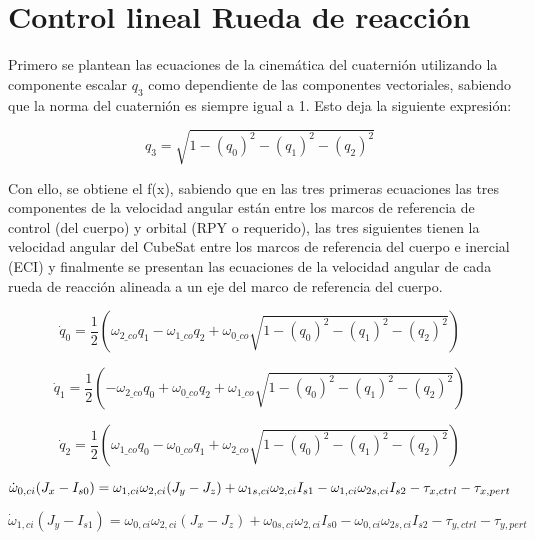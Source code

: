 \section{Control lineal Rueda de reacción}

\label{ap:Z6}

Primero se plantean las ecuaciones de la cinemática del cuaternión utilizando la componente escalar \( q_3 \) como dependiente de las componentes vectoriales, sabiendo que la norma del cuaternión es siempre igual a 1. Esto deja la siguiente expresión:

\[
q_3 = \sqrt{1 - (q_0)^2 - (q_1)^2 - (q_2)^2}
\]

Con ello, se obtiene el f(x), sabiendo que en las tres primeras ecuaciones las tres componentes de la velocidad angular están entre los marcos de referencia de control (del cuerpo) y orbital (RPY o requerido), las tres siguientes tienen la velocidad angular del CubeSat entre los marcos de referencia del cuerpo e inercial (ECI) y finalmente se presentan las ecuaciones de la velocidad angular de cada rueda de reacción alineada a un eje del marco de referencia del cuerpo.

\begin{equation}
	\dot{q}_0 = \frac{1}{2} \left( \omega_{2\_co} q_1 - \omega_{1\_co} q_2 + \omega_{0\_co} \sqrt{1 - (q_0)^2 - (q_1)^2 - (q_2)^2} \right)
\end{equation}

\begin{equation}
	\dot{q}_1 = \frac{1}{2} \left( -\omega_{2\_co} q_0 + \omega_{0\_co} q_2 + \omega_{1\_co} \sqrt{1 - (q_0)^2 - (q_1)^2 - (q_2)^2} \right)
\end{equation}

\begin{equation}
	\dot{q}_2 = \frac{1}{2} \left( \omega_{1\_co} q_0 - \omega_{0\_co} q_1 + \omega_{2\_co} \sqrt{1 - (q_0)^2 - (q_1)^2 - (q_2)^2} \right)
\end{equation}

\begin{equation}
	\dot{\omega}_{0,ci} (J_x - I_{s0}) = \omega_{1,ci} \omega_{2,ci} (J_y - J_z) + \omega_{1s,ci} \omega_{2,ci} I_{s1} - \omega_{1,ci} \omega_{2s,ci} I_{s2} - \tau_{x,ctrl} - \tau_{x,pert} \\
\end{equation}

\begin{equation}
	\dot{\omega}_{1,ci} (J_y - I_{s1}) = \omega_{0,ci} \omega_{2,ci} (J_x - J_z) + \omega_{0s,ci} \omega_{2,ci} I_{s0} - \omega_{0,ci} \omega_{2s,ci} I_{s2} - \tau_{y,ctrl} - \tau_{y,pert}
\end{equation}

